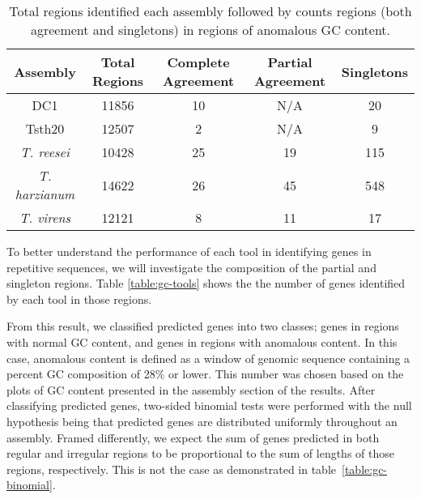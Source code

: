 \begin{table}
  \begin{center}
    \begin{tabular}{|c|c|c|c|c|}
      Assembly & Total Regions & Complete Agreement & Partial Agreement & Singletons \\ \hline
      DC1 & 11856 & 10 & N/A & 20  \\ \hline
      Tsth20 & 12507 & 2 & N/A & 9  \\ \hline
      \textit{T. reesei} & 10428 & 25 & 19 & 115  \\ \hline
      \textit{T. harzianum} & 14622 & 26 & 45 & 548  \\ \hline
      \textit{T. virens} & 12121 & 8 & 11 & 17  \\ \hline
    \end{tabular}
  \end{center}
  \caption[Agreement of predictions in anomalous GC regions.]{Total
    regions identified each assembly followed by counts regions (both
    agreement and singletons) in regions of anomalous GC content.}
  \label{table:gc-regions}
\end{table}

To better understand the performance of each tool in identifying genes
in repetitive sequences, we will investigate the composition of the
partial and singleton regions. Table \ref{table:gc-tools} shows the
the number of genes identified by each tool in those regions.



From this result, we classified predicted genes into two classes;
genes in regions with normal GC content, and genes in regions with
anomalous content. In this case, anomalous content is defined as a
window of genomic sequence containing a percent GC composition of 28\%
or lower. This number was chosen based on the plots of GC content
presented in the assembly section of the results. After classifying
predicted genes, two-sided binomial tests were performed with the null
hypothesis being that predicted genes are distributed uniformly
throughout an assembly. Framed differently, we expect the sum of genes
predicted in both regular and irregular regions to be proportional to
the sum of lengths of those regions, respectively. This is not the
case as demonstrated in table~\ref{table:gc-binomial}.

